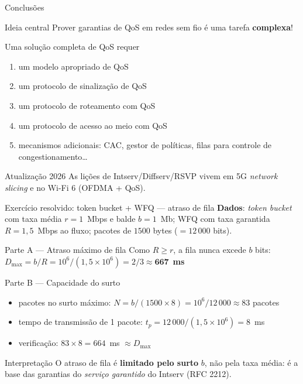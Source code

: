 \documentclass[aspectratio=169,11pt]{beamer}
\begin{document}
\begin{frame}{Conclusões}
  \begin{alertblock}{Ideia central}
    Prover garantias de QoS em redes sem fio é uma tarefa \textbf{complexa}!
  \end{alertblock}
  \begin{block}{Uma solução completa de QoS requer}
    \begin{enumerate}
      \item um modelo apropriado de QoS
      \item um protocolo de sinalização de QoS
      \item um protocolo de roteamento com QoS
      \item um protocolo de acesso ao meio com QoS
      \item mecanismos adicionais: CAC, gestor de políticas, filas para controle de congestionamento\ldots
    \end{enumerate}
  \end{block}
  \begin{exampleblock}{Atualização 2026}
    As lições de Intserv/Diffserv/RSVP vivem em 5G \emph{network slicing} e no Wi-Fi 6 (OFDMA + QoS).
  \end{exampleblock}
\end{frame}

\begin{frame}{Exercício resolvido: token bucket + WFQ --- atraso de fila}
  \textbf{Dados}: \emph{token bucket} com taxa média $r=1$~Mbps e balde $b=1$~Mb; WFQ com taxa garantida $R=1{,}5$~Mbps ao fluxo; pacotes de $1500$ bytes ($=12\,000$ bits).
  \begin{block}{Parte A --- Atraso máximo de fila}
    Como $R\geq r$, a fila nunca excede $b$ bits: $D_{\max}=b/R=10^6/(1{,}5\times 10^6)=2/3\approx \mathbf{667}$~\textbf{ms}
  \end{block}
  \pause
  \begin{block}{Parte B --- Capacidade do surto}
    \begin{itemize}
      \item pacotes no surto máximo: $N=b/(1500\times 8)=10^6/12\,000\approx 83$ pacotes
      \item tempo de transmissão de 1 pacote: $t_p=12\,000/(1{,}5\times 10^6)=8$~ms
      \item verificação: $83\times 8=664$~ms $\approx D_{\max}$ \checkmark
    \end{itemize}
  \end{block}
  \pause
  \begin{alertblock}{Interpretação}
    O atraso de fila é \textbf{limitado pelo surto} $b$, não pela taxa média: é a base das garantias do \emph{serviço garantido} do Intserv (RFC 2212).
  \end{alertblock}
\end{frame}
\end{document}
